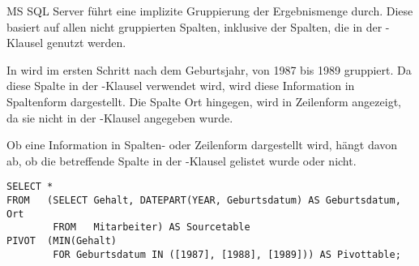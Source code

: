 \begin{merke}
    MS SQL Server führt eine implizite Gruppierung der Ergebnismenge durch. Diese basiert auf allen nicht gruppierten Spalten, inklusive der Spalten, die in der -Klausel genutzt werden.
\end{merke}
In  wird im ersten Schritt nach dem Geburtsjahr, von 1987 bis 1989 gruppiert. Da diese Spalte in der -Klausel verwendet wird, wird diese Information in Spaltenform dargestellt. Die Spalte Ort hingegen, wird in Zeilenform angezeigt, da sie nicht in der -Klausel angegeben wurde.

\begin{merke}
    Ob eine Information in Spalten- oder Zeilenform dargestellt wird, hängt davon ab, ob die betreffende Spalte in der -Klausel gelistet wurde oder nicht.
\end{merke}
\begin{lstlisting}[language=ms_sql,caption={Zusätzliche Gruppierungen in einer Pivot-Abfrage},label=sql06_26]
SELECT *
FROM   (SELECT Gehalt, DATEPART(YEAR, Geburtsdatum) AS Geburtsdatum, Ort
        FROM   Mitarbeiter) AS Sourcetable
PIVOT  (MIN(Gehalt)
        FOR Geburtsdatum IN ([1987], [1988], [1989])) AS Pivottable;
          \end{lstlisting}
